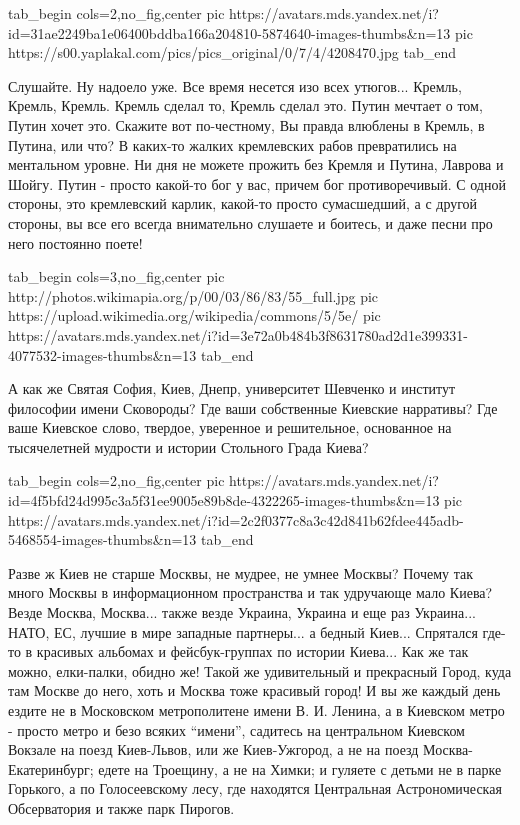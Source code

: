 \ifcmt
  tab_begin cols=2,no_fig,center
     pic https://avatars.mds.yandex.net/i?id=31ae2249ba1e06400bddba166a204810-5874640-images-thumbs&n=13
		 pic https://s00.yaplakal.com/pics/pics_original/0/7/4/4208470.jpg
  tab_end
\fi

Слушайте. Ну надоело уже. Все время несется изо всех утюгов... Кремль, Кремль,
Кремль. Кремль сделал то, Кремль сделал это. Путин мечтает о том, Путин хочет
это. Скажите вот по-честному, Вы правда влюблены в Кремль, в Путина, или что? В
каких-то жалких кремлевских рабов превратились на ментальном уровне. Ни дня не
можете прожить без Кремля и Путина, Лаврова и Шойгу. Путин - просто какой-то
бог у вас, причем бог противоречивый. С одной стороны, это кремлевский карлик,
какой-то просто сумасшедший, а с другой стороны, вы все его всегда внимательно
слушаете и боитесь, и даже песни про него постоянно поете!

\ifcmt
  tab_begin cols=3,no_fig,center
     pic http://photos.wikimapia.org/p/00/03/86/83/55_full.jpg
		 pic https://upload.wikimedia.org/wikipedia/commons/5/5e/%
		 pic https://avatars.mds.yandex.net/i?id=3e72a0b484b3f8631780ad2d1e399331-4077532-images-thumbs&n=13 
  tab_end
\fi

А как же Святая София, Киев, Днепр, университет Шевченко и институт
философии имени Сковороды? Где ваши собственные Киевские нарративы? Где ваше
Киевское слово, твердое, уверенное и решительное, основанное на тысячелетней
мудрости и истории Стольного Града Киева? 

\ifcmt
  tab_begin cols=2,no_fig,center
     pic https://avatars.mds.yandex.net/i?id=4f5bfd24d995c3a5f31ee9005e89b8de-4322265-images-thumbs&n=13
		 pic https://avatars.mds.yandex.net/i?id=2c2f0377c8a3c42d841b62fdee445adb-5468554-images-thumbs&n=13
  tab_end
\fi

Разве ж Киев не старше Москвы, не мудрее, не умнее Москвы?  Почему так много
Москвы в информационном пространства и так удручающе мало Киева? Везде Москва,
Москва... также везде Украина, Украина и еще раз Украина... НАТО, ЕС, лучшие в
мире западные партнеры...  а бедный Киев... Спрятался где-то в красивых
альбомах и фейсбук-группах по истории Киева... Как же так можно, елки-палки,
обидно же! Такой же удивительный и прекрасный Город, куда там Москве до него,
хоть и Москва тоже красивый город! И вы же каждый день ездите не в Московском
метрополитене имени В. И. Ленина, а в Киевском метро - просто метро и безо
всяких \enquote{имени}, садитесь на центральном Киевском Вокзале на поезд
Киев-Львов, или же  Киев-Ужгород, а не на поезд Москва-Екатеринбург; едете на
Троещину, а не на Химки; и гуляете с детьми не в парке Горького, а по
Голосеевскому лесу, где находятся Центральная Астрономическая Обсерватория и
также парк Пирогов.

